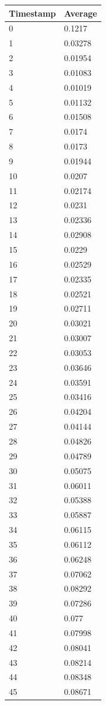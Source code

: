 %
%
\begin{tabular}{|l||l|}
\hline
	\textbf{Timestamp} & \textbf{Average} \\ \hline
	0 & 0.1217 \\ \hline
	1 & 0.03278 \\ \hline
	2 & 0.01954 \\ \hline
	3 & 0.01083 \\ \hline
	4 & 0.01019 \\ \hline
	5 & 0.01132 \\ \hline
	6 & 0.01508 \\ \hline
	7 & 0.0174 \\ \hline
	8 & 0.0173 \\ \hline
	9 & 0.01944 \\ \hline
	10 & 0.0207 \\ \hline
	11 & 0.02174 \\ \hline
	12 & 0.0231 \\ \hline
	13 & 0.02336 \\ \hline
	14 & 0.02908 \\ \hline
	15 & 0.0229 \\ \hline
	16 & 0.02529 \\ \hline
	17 & 0.02335 \\ \hline
	18 & 0.02521 \\ \hline
	19 & 0.02711 \\ \hline
	20 & 0.03021 \\ \hline
	21 & 0.03007 \\ \hline
	22 & 0.03053 \\ \hline
	23 & 0.03646 \\ \hline
	24 & 0.03591 \\ \hline
	25 & 0.03416 \\ \hline
	26 & 0.04204 \\ \hline
	27 & 0.04144 \\ \hline
	28 & 0.04826 \\ \hline
	29 & 0.04789 \\ \hline
	30 & 0.05075 \\ \hline
	31 & 0.06011 \\ \hline
	32 & 0.05388 \\ \hline
	33 & 0.05887 \\ \hline
	34 & 0.06115 \\ \hline
	35 & 0.06112 \\ \hline
	36 & 0.06248 \\ \hline
	37 & 0.07062 \\ \hline
	38 & 0.08292 \\ \hline
	39 & 0.07286 \\ \hline
	40 & 0.077 \\ \hline
	41 & 0.07998 \\ \hline
	42 & 0.08041 \\ \hline
	43 & 0.08214 \\ \hline
	44 & 0.08348 \\ \hline
	45 & 0.08671 \\ \hline
\end{tabular}
